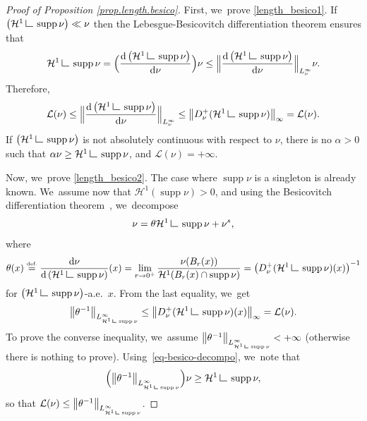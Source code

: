 \documentclass[10pt]{amsart}
\theoremstyle{definition}
\newcommand{\eqdef}{\ensuremath{\stackrel{\mbox{\upshape\tiny def.}}{=}}}
\newcommand{\norm}[1]{\left\lVert#1\right\rVert}
\newcommand{\Bnorm}[1]{\Bigl\lVert#1\Bigr\rVert}
\newcommand\LM[1]{\hbox{\vrule width.5pt \vbox to#1pt{\vfill \hrule width#1pt height.5pt}}}
\newcommand\LL{{\mathchoice {\>\LM7\>}{\>\LM7\>}{\,\LM5\,}{\,\LM{3.35}\,}}}
\newcommand{\mres}{\LL}
\newcommand\cH{\mathcal{H}}
\DeclareMathOperator{\supp}{supp}
\newcommand\dd{\mathrm{d}}
\begin{document}
\begin{proof}[Proof of Proposition \ref{prop.length.besico}]
First, we~prove \eqref{length_besico1}. If $\left(\cH^1\mres \supp \nu\right) \ll \nu$ then the Lebesgue-Besicovitch differentiation theorem ensures that
\begin{equation*}
\cH^1\mres \supp \nu = \Bigl(\frac{\dd \left(\cH^1\mres \supp\nu\right)}{\dd \nu}\Bigr)\nu \leq \Bnorm{\frac{\dd \left(\cH^1\mres \supp\nu\right)}{\dd \nu}}_{L^{\infty}_\nu}\nu.
\end{equation*}
Therefore,
\begin{equation*}
\mathcal{L}(\nu)\leq \Bnorm{\frac{\dd \left(\cH^1\mres \supp\nu\right)}{\dd \nu}}_{L^{\infty}_\nu} \leq \norm{D^+_\nu(\cH^1\mres \supp\nu)}_{\infty}=\mathcal{L}(\nu).
\end{equation*}
If $\left(\cH^1\mres \supp \nu\right)$ is not absolutely continuous with respect to $\nu$, there is no $\alpha>0$ such that $\alpha \nu \geq \cH^1\mres \supp\nu$, and $\mathcal{L}(\nu)=+\infty$.

Now, we~prove \eqref{length_besico2}. The case where $\supp \nu$ is a singleton is already known. We~\hbox{assume} now that $\cH^1(\supp \nu)>0$, and using the Besicovitch differentiation theorem~\cite[Th.\,2.22]{ambrosio2000functions}, we~decompose
\begin{equation}
\nu = \theta\cH^1\mres \supp \nu + \nu^s,\label{eq-besico-decompo}
\end{equation}
where
\[
\theta(x)\eqdef \frac{\dd \nu}{\dd \left(\cH^1\mres \supp\nu\right)}(x)= \lim_{r \to 0^+} \frac{\nu(B_r(x))}{\cH^1(B_r(x)\cap \supp \nu)} =\left(D^+_\nu(\cH^1\mres \supp\nu)(x)\right)^{-1}
\]
for $\left(\cH^1\mres \supp\nu\right)$-a.e.\ $x$. From the last equality, we~get
\begin{equation*}
\norm{\theta^{-1}}_{L^{\infty}_{\cH^1\mres \supp\nu}} \leq \norm{D^+_\nu(\cH^1\mres \supp\nu)(x)}_\infty =\mathcal{L}(\nu).
\end{equation*}
To prove the converse inequality, we~assume $\norm{\theta^{-1}}_{L^{\infty}_{\cH^1\mres \supp\nu}}<+\infty$ (otherwise there is nothing to prove). Using~\eqref{eq-besico-decompo}, we~note that
\begin{equation*}
\Bigl(\norm{\theta^{-1}}_{L^{\infty}_{\cH^1\mres \supp\nu}}\Bigr)\nu \ge \cH^1\mres \supp\nu,
\end{equation*}
so that $\mathcal{L}(\nu)\le \norm{\theta^{-1}}_{L^{\infty}_{\cH^1\mres \supp\nu}}$.
\end{proof}
\end{document}
